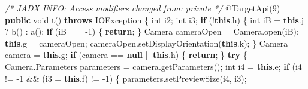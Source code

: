 \documentclass[
]{article}
\newenvironment{Shaded}{}{}
\newcommand{\AttributeTok}[1]{\textcolor[rgb]{0.49,0.56,0.16}{#1}}
\newcommand{\BuiltInTok}[1]{\textcolor[rgb]{0.00,0.50,0.00}{#1}}
\newcommand{\CommentTok}[1]{\textcolor[rgb]{0.38,0.63,0.69}{\textit{#1}}}
\newcommand{\ControlFlowTok}[1]{\textcolor[rgb]{0.00,0.44,0.13}{\textbf{#1}}}
\newcommand{\DataTypeTok}[1]{\textcolor[rgb]{0.56,0.13,0.00}{#1}}
\newcommand{\DecValTok}[1]{\textcolor[rgb]{0.25,0.63,0.44}{#1}}
\newcommand{\FunctionTok}[1]{\textcolor[rgb]{0.02,0.16,0.49}{#1}}
\newcommand{\KeywordTok}[1]{\textcolor[rgb]{0.00,0.44,0.13}{\textbf{#1}}}
\newcommand{\NormalTok}[1]{#1}
\newcommand{\OperatorTok}[1]{\textcolor[rgb]{0.40,0.40,0.40}{#1}}
\begin{document}
\begin{Shaded}
\begin{Highlighting}[]
    \CommentTok{/* JADX INFO: Access modifiers changed from: private */}
    \AttributeTok{@TargetApi}\OperatorTok{(}\DecValTok{9}\OperatorTok{)}
    \KeywordTok{public} \DataTypeTok{void} \FunctionTok{t}\OperatorTok{()} \KeywordTok{throws} \BuiltInTok{IOException} \OperatorTok{\{}
        \DataTypeTok{int}\NormalTok{ i2}\OperatorTok{;}
        \DataTypeTok{int}\NormalTok{ i3}\OperatorTok{;}
        \ControlFlowTok{if} \OperatorTok{(!}\KeywordTok{this}\OperatorTok{.}\FunctionTok{h}\OperatorTok{)} \OperatorTok{\{}
            \DataTypeTok{int}\NormalTok{ iB }\OperatorTok{=} \KeywordTok{this}\OperatorTok{.}\FunctionTok{j} \OperatorTok{?} \FunctionTok{b}\OperatorTok{()} \OperatorTok{:} \FunctionTok{a}\OperatorTok{();}
            \ControlFlowTok{if} \OperatorTok{(}\NormalTok{iB }\OperatorTok{==} \OperatorTok{{-}}\DecValTok{1}\OperatorTok{)} \OperatorTok{\{}
                \ControlFlowTok{return}\OperatorTok{;}
            \OperatorTok{\}}
\NormalTok{            Camera cameraOpen }\OperatorTok{=}\NormalTok{ Camera}\OperatorTok{.}\FunctionTok{open}\OperatorTok{(}\NormalTok{iB}\OperatorTok{);}
            \KeywordTok{this}\OperatorTok{.}\FunctionTok{g} \OperatorTok{=}\NormalTok{ cameraOpen}\OperatorTok{;}
\NormalTok{            cameraOpen}\OperatorTok{.}\FunctionTok{setDisplayOrientation}\OperatorTok{(}\KeywordTok{this}\OperatorTok{.}\FunctionTok{k}\OperatorTok{);}
        \OperatorTok{\}}
\NormalTok{        Camera camera }\OperatorTok{=} \KeywordTok{this}\OperatorTok{.}\FunctionTok{g}\OperatorTok{;}
        \ControlFlowTok{if} \OperatorTok{(}\NormalTok{camera }\OperatorTok{==} \KeywordTok{null} \OperatorTok{||} \KeywordTok{this}\OperatorTok{.}\FunctionTok{h}\OperatorTok{)} \OperatorTok{\{}
            \ControlFlowTok{return}\OperatorTok{;}
        \OperatorTok{\}}
        \ControlFlowTok{try} \OperatorTok{\{}
\NormalTok{            Camera}\OperatorTok{.}\FunctionTok{Parameters}\NormalTok{ parameters }\OperatorTok{=}\NormalTok{ camera}\OperatorTok{.}\FunctionTok{getParameters}\OperatorTok{();}
            \DataTypeTok{int}\NormalTok{ i4 }\OperatorTok{=} \KeywordTok{this}\OperatorTok{.}\FunctionTok{e}\OperatorTok{;}
            \ControlFlowTok{if} \OperatorTok{(}\NormalTok{i4 }\OperatorTok{!=} \OperatorTok{{-}}\DecValTok{1} \OperatorTok{\&\&} \OperatorTok{(}\NormalTok{i3 }\OperatorTok{=} \KeywordTok{this}\OperatorTok{.}\FunctionTok{f}\OperatorTok{)} \OperatorTok{!=} \OperatorTok{{-}}\DecValTok{1}\OperatorTok{)} \OperatorTok{\{}
\NormalTok{                parameters}\OperatorTok{.}\FunctionTok{setPreviewSize}\OperatorTok{(}\NormalTok{i4}\OperatorTok{,}\NormalTok{ i3}\OperatorTok{);}

\end{Highlighting}
\end{Shaded}
\end{document}
